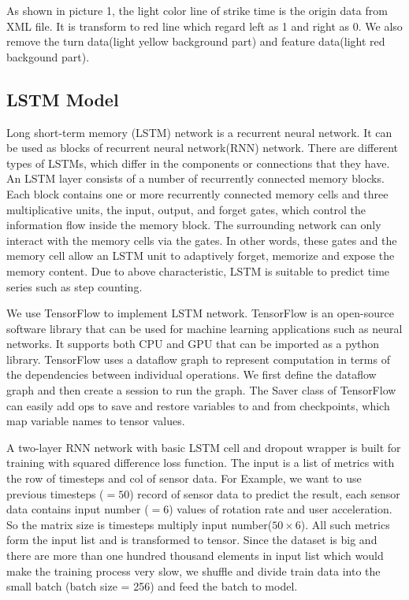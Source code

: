 \documentclass[11pt]{article}
\begin{document}
As shown in picture 1, the light color line of strike time is the origin data from XML file. It is transform to red line which regard left as 1 and right as 0. We also remove the turn data(light yellow background part) and feature data(light red backgound part).




\subsection{LSTM Model}
Long short-term memory (LSTM) network is a recurrent neural network. It can be used as blocks of recurrent neural network(RNN) network. There are different types of LSTMs, which differ in the components or connections that they have. An LSTM layer consists of a number of recurrently connected memory blocks. Each block contains one or more recurrently connected memory cells and three multiplicative units, the input, output, and forget gates, which control the information flow inside the memory block. The surrounding network can only interact with the memory cells via the gates. In other words, these gates and the memory cell allow an LSTM unit to adaptively forget, memorize and expose the memory content. Due to above characteristic, LSTM is suitable to predict time series such as step counting.

We use TensorFlow to implement LSTM network. TensorFlow is an open-source software library that can be used for machine learning applications such as neural networks. It supports both CPU and GPU that can be imported as a python library. TensorFlow uses a dataflow graph to represent computation in terms of the dependencies between individual operations. We first define the dataflow graph and then create a session to run the graph. The Saver class of TensorFlow can easily add ops to save and restore variables to and from checkpoints, which map variable names to tensor values.

A two-layer RNN network with basic LSTM cell and dropout wrapper is built for training with squared difference loss function. The input is a list of metrics with the row of timesteps and col of sensor data. For Example, we want to use previous timesteps ($=50$) record of sensor data to predict the result, each sensor data contains input number ($=6$) values of rotation rate and user acceleration. So the matrix size is timesteps multiply input number($50 \times 6$). All such metrics form the input list and is transformed to tensor. Since the dataset is big and there are more than one hundred thousand elements in input list which would make the training process very slow, we shuffle and divide train data into the small batch (batch size = 256) and feed the batch to model.
\end{document}
